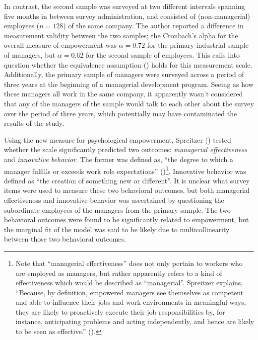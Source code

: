 \documentclass[
  11pt,
  a4paper,
]{article}
\begin{document}
In contrast, the second sample was surveyed at two different intervals
spanning five months in between survey administration, and consisted of
(non-managerial) employees (\(n = 128\)) of the same company. The author
reported a difference in measurement validity between the two samples;
the Cronbach's alpha for the overall measure of empowerment was
\(\alpha = 0.72\) for the primary industrial sample of managers, but
\(\alpha = 0.62\) for the second sample of employees. This calls into
question whether the equivalence assumption
() holds for
this measurement scale. Additionally, the primary sample of managers
were surveyed across a period of three years at the beginning of a
managerial development program. Seeing as how these managers all work in
the same company, it apparently wasn't considered that any of the
managers of the sample would talk to each other about the survey over
the period of three years, which potentially may have contaminated the
results of the study.

Using the new measure for psychological empowerment, Spreitzer
() tested whether the scale
significantly predicted two outcomes: \emph{managerial effectiveness}
and \emph{innovative behavior}. The former was defined as, ``the degree
to which a manager fulfills or exceeds work role expectations''
()\footnote{Note that
  ``managerial effectiveness'' does not only pertain to workers who are
  employed as managers, but rather apparently refers to a kind of
  effectiveness which would be described as ``managerial''. Spreitzer
  explains, ``Because, by definition, empowered managers see themselves
  as competent and able to influence their jobs and work environments in
  meaningful ways, they are likely to proactively execute their job
  responsibilities by, for instance, anticipating problems and acting
  independently, and hence are likely to be seen as effective.''
  ().}. Innovative behavior was
defined as ``the creation of something new or different''. It is unclear
what survey items were used to measure these two behavioral outcomes,
but both managerial effectiveness and innovative behavior was
ascertained by questioning the subordinate employees of the managers
from the primary sample. The two behavioral outcomes were found to be
significantly related to empowerment, but the marginal fit of the model
was said to be likely due to multicollinearity between those two
behavioral outcomes.
\end{document}
